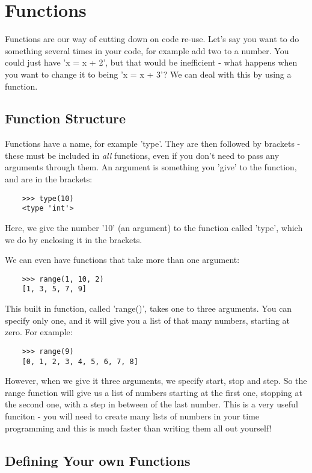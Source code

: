 \section{Functions}

Functions are our way of cutting down on code re-use. Let's say you want to do
something several times in your code, for example add two to a number. You could
just have 'x = x + 2', but that would be inefficient - what happens when you
want to change it to being 'x = x + 3'? We can deal with this by using a
function.

\subsection{Function Structure}

Functions have a name, for example 'type'. They are then followed by brackets -
these must be included in \emph{all} functions, even if you don't need to pass
any arguments through them. An argument is something you 'give' to the function,
and are in the brackets:

\begin{lstlisting}
    >>> type(10)
    <type 'int'>
\end{lstlisting}

Here, we give the number '10' (an argument) to the function called 'type', which
we do by enclosing it in the brackets.

We can even have functions that take more than one argument:

\begin{lstlisting}
    >>> range(1, 10, 2)
    [1, 3, 5, 7, 9]
\end{lstlisting}

This built in function, called 'range()', takes one to three arguments. You can specify only one, and it will give you a list of that many numbers, starting at zero. For example:

\begin{lstlisting}
    >>> range(9)
    [0, 1, 2, 3, 4, 5, 6, 7, 8]
\end{lstlisting}

However, when we give it three arguments, we specify start, stop and step. So
the range function will give us a list of numbers starting at the first one,
stopping at the second one, with a step in between of the last number. This is a
very useful funciton - you will need to create many lists of numbers in your
time programming and this is much faster than writing them all out yourself!

\subsection{Defining Your own Functions}



